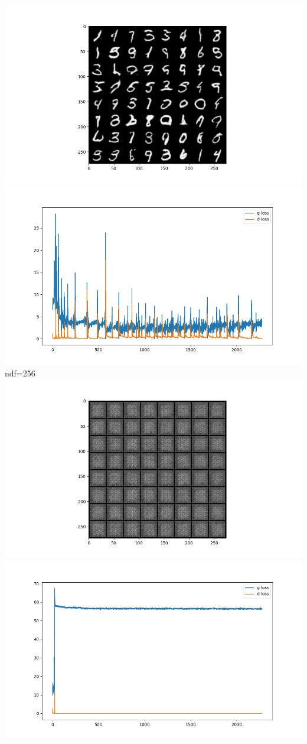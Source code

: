 \includegraphics{./images/Pasted image 20231228114224.png}\includegraphics{./images/Pasted image 20231228114234.png}
ndf=256
\includegraphics{./images/Pasted image 20231228114302.png}\includegraphics{./images/Pasted image 20231228114321.png}

